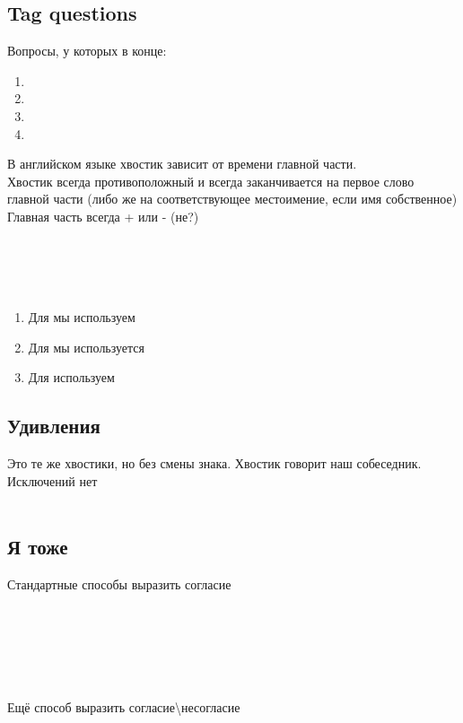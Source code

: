 \subsection{Tag questions}
\p
Вопросы, у которых в конце:
\begin{enumerate}
    \item {}
    \item {}
    \item {}
    \item {}
\end{enumerate}
В английском языке хвостик зависит от времени главной части.\\
Хвостик всегда противоположный и всегда заканчивается на первое слово главной части (либо же на соответствующее
местоимение, если имя собственное)\\
Главная часть всегда + или - (не?)\\
\\
\\
\\\\
\begin{enumerate}
    \item Для  мы используем 
    \item Для  мы используется 
    \item Для  используем 
\end{enumerate}

\subsection{Удивления}
\p
Это те же хвостики, но без смены знака. Хвостик говорит наш собеседник. Исключений нет\\
\\

\subsection{Я тоже}
\p
Стандартные способы выразить согласие\\
\\
\\\\
\\
\\\\
Ещё способ выразить согласие\textbackslash несогласие\\
\\
\\

